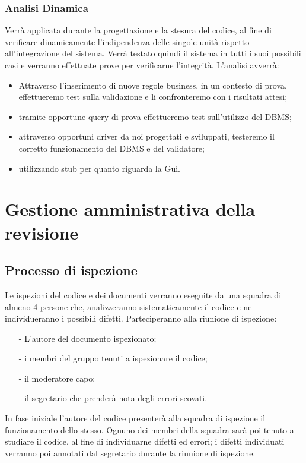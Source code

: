 \documentclass[11pt,titlepage,a4paper]{report}
\begin{document}
\subsection{Analisi Dinamica}
Verr\`a applicata durante la progettazione e la stesura del codice, al fine di verificare dinamicamente l'indipendenza delle singole unit\`a rispetto all'integrazione del sistema. Verr\`a testato quindi il sistema in tutti i suoi possibili casi e verranno effettuate prove per verificarne l'integrit\`a. L'analisi avverr\`a:
\begin{itemize}
\item Attraverso l'inserimento di nuove regole business, in un contesto di prova, effettueremo test sulla validazione e li confronteremo con i risultati attesi;
\item tramite opportune query di prova effettueremo test sull'utilizzo del DBMS;
\item attraverso opportuni driver da noi progettati e sviluppati, testeremo il corretto funzionamento del DBMS e del validatore;
\item utilizzando stub per quanto riguarda la Gui. 
\end{itemize}

\chapter[Gestione revisione]{Gestione amministrativa della revisione} 
\section{Processo di ispezione}
Le ispezioni del codice e dei documenti verranno eseguite da una squadra di almeno 4 persone che, analizzeranno sistematicamente il codice e ne individueranno i possibili difetti. Parteciperanno alla riunione di ispezione: 
\begin{itemize}
\item[-]L'autore del documento ispezionato;
\item[-]i membri del gruppo tenuti a ispezionare il codice;
\item[-]il moderatore capo;
\item[-]il segretario che prender\`a nota degli errori scovati.
\end{itemize}
In fase iniziale l'autore del codice presenter\`a alla squadra di ispezione il funzionamento dello stesso. Ognuno dei membri della squadra sar\`a poi tenuto a studiare il codice, al fine di individuarne difetti ed errori; i difetti individuati verranno poi annotati dal segretario durante la riunione di ispezione. 
\end{document}
